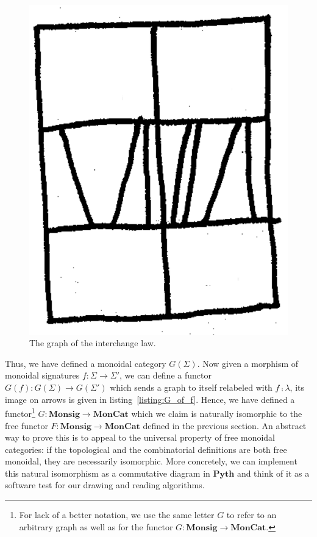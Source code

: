 \begin{figure}[H]
\centering
\includegraphics[scale=0.1]{img/interchange.png}
\caption{The graph of the interchange law.}
\label{fig:interchange}
\end{figure}

Thus, we have defined a monoidal category $G(\Sigma)$.
Now given a morphism of monoidal signatures $f : \Sigma \to \Sigma'$, we can define a functor $G(f) : G(\Sigma) \to G(\Sigma')$ which sends a graph to itself relabeled with $f \fcmp \lambda$, its image on arrows is given in listing~\ref{listing:G_of_f}.
Hence, we have defined a functor\footnote
{For lack of a better notation, we use the same letter $G$ to refer to an arbitrary graph as well as for the functor $G  : \mathbf{Monsig} \to \mathbf{MonCat}$.} $G : \mathbf{Monsig} \to \mathbf{MonCat}$ which we claim is naturally isomorphic to the free functor $F : \mathbf{Monsig} \to \mathbf{MonCat}$ defined in the previous section.
An abstract way to prove this is to appeal to the universal property of free monoidal categories: if the topological and the combinatorial definitions are both free monoidal, they are necessarily isomorphic.
More concretely, we can implement this natural isomorphism as a commutative diagram in $\mathbf{Pyth}$ and think of it as a software test for our drawing and reading algorithms.

